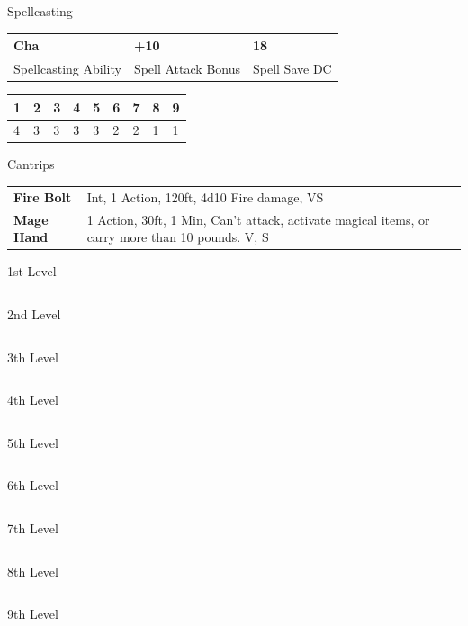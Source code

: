 \documentclass[a4paper,10pt,bg=print]{dndbook} %
\def\SpellAbility{Cha}
\def\SpellAtk{+10}
\def\SpellSaveDC{18}
\def\FirstLevelSlots{4}
\def\SecondLevelSlots{3}
\def\ThirdLevelSlots{3}
\def\FourthLevelSlots{3}
\def\FifthLevelSlots{3}
\def\SixthLevelSlots{2}
\def\SeventhLevelSlots{2}
\def\EightLevelSlots{1}
\def\NinthLevelSlots{1}
\def\Cantrips{
	\begin{tabularx}{\linewidth}{lX}
		\textbf{Fire Bolt} & Int, 1 Action, 120ft, 4d10 Fire damage, VS\\
		\textbf{Mage Hand} & 1 Action, 30ft, 1 Min, Can’t attack, activate magical items, or carry more than 10 pounds. V, S\\
	\end{tabularx}
}
\def\FirstLevelSpells{
	\begin{tabularx}{\linewidth}{lX}
		
	\end{tabularx}
}
\def\SecondLevelSpells{
	\begin{tabularx}{\linewidth}{lX}
		
	\end{tabularx}
}
\def\ThirdLevelSpells{
	\begin{tabularx}{\linewidth}{lX}
		
	\end{tabularx}
}
\def\FourthLevelSpells{
	\begin{tabularx}{\linewidth}{lX}
		
	\end{tabularx}
}
\def\FifthLevelSpells{
	\begin{tabularx}{\linewidth}{lX}
		
	\end{tabularx}
}
\def\SixthLevelSpells{
	\begin{tabularx}{\linewidth}{lX}
		
	\end{tabularx}
}
\def\SeventhLevelSpells{
	\begin{tabularx}{\linewidth}{lX}
		
	\end{tabularx}
}
\def\EightLevelSpells{
	\begin{tabularx}{\linewidth}{lX}
		
	\end{tabularx}
}
\def\NinthLevelSpells{
	\begin{tabularx}{\linewidth}{lX}
		
	\end{tabularx}
}
\begin{document}
	{\huge Spellcasting}
	\begin{center}\normalsize
		\begin{tabularx}{\textwidth}{XXX}
			\SpellAbility &\SpellAtk &\SpellSaveDC\\\hline
			\tiny{Spellcasting Ability}	& \tiny{Spell Attack Bonus}	&\tiny{Spell Save DC}
		\end{tabularx}
		\begin{tabularx}{\linewidth}{XXXXXXXXX}
			1&2&3&4&5&6&7&8&9\\\hline
			\FirstLevelSlots&
			\SecondLevelSlots&
			\ThirdLevelSlots&
			\FourthLevelSlots&
			\FifthLevelSlots&
			\SixthLevelSlots&
			\SeventhLevelSlots&
			\EightLevelSlots&
			\NinthLevelSlots
		\end{tabularx}
	\end{center}
	\begin{minipage}[t]{.334\linewidth}\scriptsize
		\textcolor{titlered}{\large Cantrips}\\
		\Cantrips
		\textcolor{titlered}{\large 1st Level}\\
		\FirstLevelSpells
		\textcolor{titlered}{\large 2nd Level}\\
		\SecondLevelSpells
	\end{minipage}%
	\begin{minipage}[t]{.333\linewidth}\scriptsize
		\textcolor{titlered}{\large 3th Level}\\
		\ThirdLevelSpells
		\textcolor{titlered}{\large 4th Level}\\
		\FourthLevelSpells
		\textcolor{titlered}{\large 5th Level}\\
		\FifthLevelSpells
	\end{minipage}%
	\begin{minipage}[t]{.333\linewidth}\scriptsize
		\textcolor{titlered}{\large 6th Level}\\
		\SixthLevelSpells
		\textcolor{titlered}{\large 7th Level}\\
		\SeventhLevelSpells
		\textcolor{titlered}{\large 8th Level}\\
		\EightLevelSpells
		\textcolor{titlered}{\large 9th Level}\\
		\NinthLevelSpells
	\end{minipage} %
\end{document}
